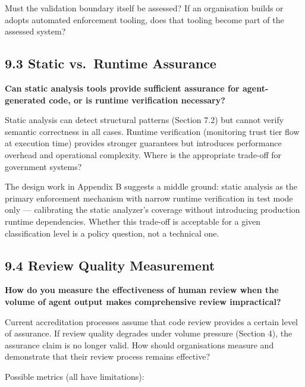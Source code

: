 \documentclass[a4paper,11pt]{report}
\begin{document}
Must the validation boundary itself be assessed? If an organisation
builds or adopts automated enforcement tooling, does that tooling become
part of the assessed system?

\hypertarget{static-vs.-runtime-assurance}{%
\subsection{9.3 Static vs.~Runtime
Assurance}\label{static-vs.-runtime-assurance}}

\textbf{Can static analysis tools provide sufficient assurance for
agent-generated code, or is runtime verification necessary?}

Static analysis can detect structural patterns (Section 7.2) but cannot
verify semantic correctness in all cases. Runtime verification
(monitoring trust tier flow at execution time) provides stronger
guarantees but introduces performance overhead and operational
complexity. Where is the appropriate trade-off for government systems?

The design work in Appendix B suggests a middle ground: static analysis
as the primary enforcement mechanism with narrow runtime verification in
test mode only --- calibrating the static analyzer's coverage without
introducing production runtime dependencies. Whether this trade-off is
acceptable for a given classification level is a policy question, not a
technical one.

\hypertarget{review-quality-measurement}{%
\subsection{9.4 Review Quality
Measurement}\label{review-quality-measurement}}

\textbf{How do you measure the effectiveness of human review when the
volume of agent output makes comprehensive review impractical?}

Current accreditation processes assume that code review provides a
certain level of assurance. If review quality degrades under volume
pressure (Section 4), the assurance claim is no longer valid. How should
organisations measure and demonstrate that their review process remains
effective?

Possible metrics (all have limitations):
\end{document}
